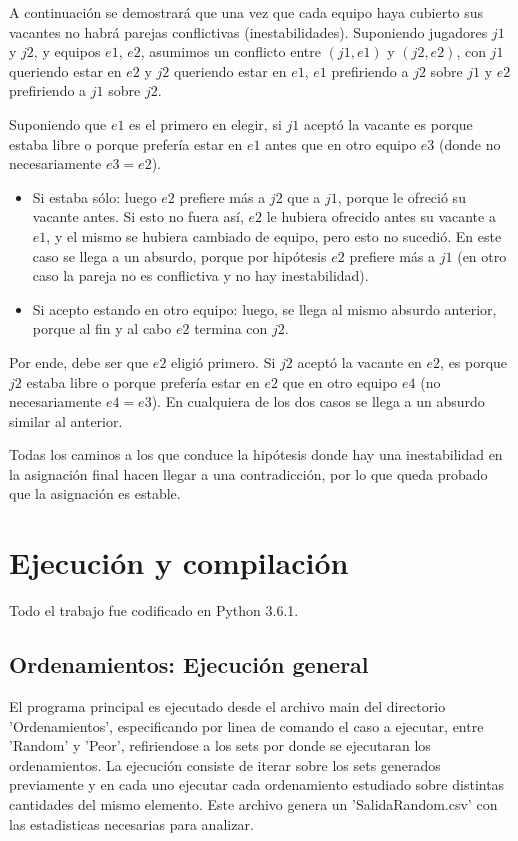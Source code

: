 \documentclass[article,a4paper]{article}
\begin{document}
A continuación se demostrará que una vez que cada equipo haya cubierto sus vacantes no habrá parejas conflictivas (inestabilidades). Suponiendo jugadores $j1$ y $j2$, y equipos $e1$, $e2$, asumimos un conflicto entre $(j1,e1)$ y $(j2,e2)$, con $j1$ queriendo estar en $e2$ y $j2$ queriendo estar en $e1$, $e1$ prefiriendo a $j2$ sobre $j1$ y $e2$ prefiriendo a $j1$ sobre $j2$.

Suponiendo que $e1$ es el primero en elegir, si $j1$ aceptó la vacante es porque estaba libre o porque prefería estar en $e1$ antes que en otro equipo $e3$ (donde no necesariamente $e3 = e2$).

\begin{itemize}
\item{Si estaba sólo: } luego $e2$ prefiere más a $j2$ que a $j1$, porque le ofreció su vacante antes. Si esto no fuera así, $e2$ le hubiera ofrecido antes su vacante a $e1$, y el mismo se hubiera cambiado de equipo, pero esto no sucedió. En este caso se llega a un absurdo, porque por hipótesis $e2$ prefiere más a $j1$ (en otro caso la pareja no es conflictiva y no hay inestabilidad).
\item{Si acepto estando en otro equipo: } luego, se llega al mismo absurdo anterior, porque al fin y al cabo $e2$ termina con $j2$.
\end{itemize}

Por ende, debe ser que $e2$ eligió primero. Si $j2$ aceptó la vacante en $e2$, es porque $j2$ estaba libre o porque prefería estar en $e2$ que en otro equipo $e4$ (no necesariamente $e4 = e3$). En cualquiera de los dos casos se llega a un absurdo similar al anterior.

Todas los caminos a los que conduce la hipótesis donde hay una inestabilidad en la asignación final hacen llegar a una contradicción, por lo que queda probado que la asignación es estable.


\newpage
\appendix

\section{Ejecución y compilación}

Todo el trabajo fue codificado en Python 3.6.1.

\subsection{Ordenamientos: Ejecución general}

El programa principal es ejecutado desde el archivo main del directorio 'Ordenamientos', especificando por linea de comando el caso a ejecutar, entre 'Random' y 'Peor', refiriendose a los sets por donde se ejecutaran los ordenamientos. La ejecución consiste de iterar sobre los sets generados previamente y en cada uno ejecutar cada ordenamiento estudiado sobre distintas cantidades del mismo elemento. Este archivo genera un 'SalidaRandom.csv' con las estadisticas necesarias para analizar.
\end{document}
